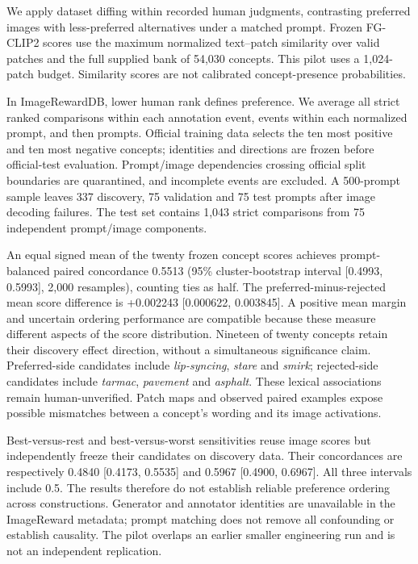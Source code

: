 We apply dataset diffing within recorded human judgments, contrasting preferred images with less-preferred alternatives under a matched prompt. Frozen FG-CLIP2 scores use the maximum normalized text--patch similarity over valid patches and the full supplied bank of 54,030 concepts. This pilot uses a 1,024-patch budget. Similarity scores are not calibrated concept-presence probabilities.

In ImageRewardDB, lower human rank defines preference. We average all strict ranked comparisons within each annotation event, events within each normalized prompt, and then prompts. Official training data selects the ten most positive and ten most negative concepts; identities and directions are frozen before official-test evaluation. Prompt/image dependencies crossing official split boundaries are quarantined, and incomplete events are excluded. A 500-prompt sample leaves 337 discovery, 75 validation and 75 test prompts after image decoding failures. The test set contains 1,043 strict comparisons from 75 independent prompt/image components.

An equal signed mean of the twenty frozen concept scores achieves prompt-balanced paired concordance 0.5513 (95\% cluster-bootstrap interval [0.4993, 0.5993], 2,000 resamples), counting ties as half. The preferred-minus-rejected mean score difference is +0.002243 [0.000622, 0.003845]. A positive mean margin and uncertain ordering performance are compatible because these measure different aspects of the score distribution. Nineteen of twenty concepts retain their discovery effect direction, without a simultaneous significance claim. Preferred-side candidates include \textit{lip-syncing}, \textit{stare} and \textit{smirk}; rejected-side candidates include \textit{tarmac}, \textit{pavement} and \textit{asphalt}. These lexical associations remain human-unverified. Patch maps and observed paired examples expose possible mismatches between a concept's wording and its image activations.

Best-versus-rest and best-versus-worst sensitivities reuse image scores but independently freeze their candidates on discovery data. Their concordances are respectively 0.4840 [0.4173, 0.5535] and 0.5967 [0.4900, 0.6967]. All three intervals include 0.5. The results therefore do not establish reliable preference ordering across constructions. Generator and annotator identities are unavailable in the ImageReward metadata; prompt matching does not remove all confounding or establish causality. The pilot overlaps an earlier smaller engineering run and is not an independent replication.

